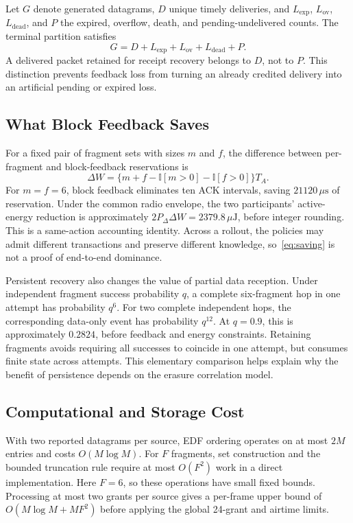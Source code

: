 \documentclass[journal,10pt]{IEEEtran}
\newcommand{\ind}{\mathbb{I}}
\newcommand{\uj}{\,\mu\mathrm{J}}
\newcommand{\us}{\,\mu\mathrm{s}}
\begin{document}
Let $G$ denote generated datagrams, $D$ unique timely deliveries, and $L_{\mathrm{exp}}$, $L_{\mathrm{ov}}$, $L_{\mathrm{dead}}$, and $P$ the expired, overflow, death, and pending-undelivered counts. The terminal partition satisfies
\begin{equation}
G=D+L_{\mathrm{exp}}+L_{\mathrm{ov}}+L_{\mathrm{dead}}+P.
\label{eq:packetledger}
\end{equation}
A delivered packet retained for receipt recovery belongs to $D$, not to $P$. This distinction prevents feedback loss from turning an already credited delivery into an artificial pending or expired loss.

\subsection{What Block Feedback Saves}
For a fixed pair of fragment sets with sizes $m$ and $f$, the difference between per-fragment and block-feedback reservations is
\begin{equation}
\Delta W=\{m+f-\ind[m>0]-\ind[f>0]\}T_A.
\label{eq:saving}
\end{equation}
For $m=f=6$, block feedback eliminates ten ACK intervals, saving $21120\us$ of reservation. Under the common radio envelope, the two participants' active-energy reduction is approximately $2P_\Delta\Delta W=2379.8\uj$, before integer rounding. This is a same-action accounting identity. Across a rollout, the policies may admit different transactions and preserve different knowledge, so~\eqref{eq:saving} is not a proof of end-to-end dominance.

Persistent recovery also changes the value of partial data reception. Under independent fragment success probability $q$, a complete six-fragment hop in one attempt has probability $q^6$. For two complete independent hops, the corresponding data-only event has probability $q^{12}$. At $q=0.9$, this is approximately $0.2824$, before feedback and energy constraints. Retaining fragments avoids requiring all successes to coincide in one attempt, but consumes finite state across attempts. This elementary comparison helps explain why the benefit of persistence depends on the erasure correlation model.

\subsection{Computational and Storage Cost}
With two reported datagrams per source, EDF ordering operates on at most $2M$ entries and costs $O(M\log M)$. For $F$ fragments, set construction and the bounded truncation rule require at most $O(F^2)$ work in a direct implementation. Here $F=6$, so these operations have small fixed bounds. Processing at most two grants per source gives a per-frame upper bound of $O(M\log M+MF^2)$ before applying the global 24-grant and airtime limits.
\end{document}
